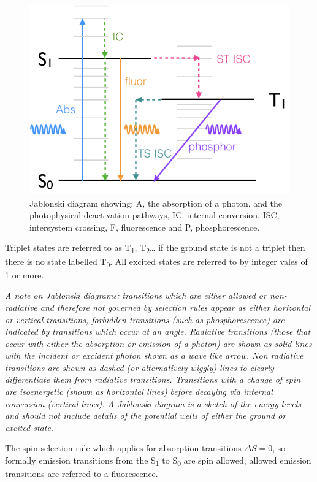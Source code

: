 \documentclass[
]{book}
\begin{document}
\begin{figure}

{\centering \includegraphics[width=0.7\linewidth]{images/Jablonski} 

}

\caption{Jablonski diagram showing: A, the absorption of a photon, and the photophysical deactivation pathways, IC, internal conversion, ISC, intersystem crossing, F, fluorescence and P, phosphorescence.}\label{fig:Jablonski}
\end{figure}

Triplet states are referred to as T\textsubscript{1}, T\textsubscript{2}\ldots{} if the ground state is not a triplet then there is no state labelled T\textsubscript{0}. All excited states are referred to by integer vales of 1 or more.

\emph{A note on Jablonski diagrams: transitions which are either allowed or non-radiative and therefore not governed by selection rules appear as either horizontal or vertical transitions, forbidden transitions (such as phosphorescence) are indicated by transitions which occur at an angle. Radiative transitions (those that occur with either the absorption or emission of a photon) are shown as solid lines with the incident or excident photon shown as a wave like arrow. Non radiative transitions are shown as dashed (or alternatively wiggly) lines to clearly differentiate them from radiative transitions. Transitions with a change of spin are isoenergetic (shown as horizontal lines) before decaying via internal conversion (vertical lines). A Jablonski diagram is a sketch of the energy levels and should not include details of the potential wells of either the ground or excited state.}

The spin selection rule which applies for absorption transitions \(\Delta S = 0\), so formally emission transitions from the S\textsubscript{1} to S\textsubscript{0} are spin allowed, allowed emission transitions are referred to a fluorescence.
\end{document}
